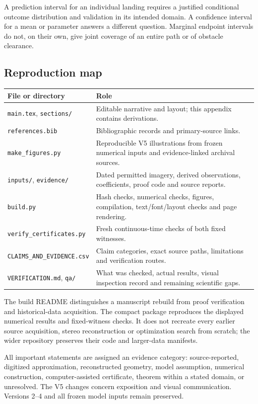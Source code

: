 A prediction interval for an individual landing requires a justified conditional outcome distribution and validation in its intended domain. A confidence interval for a mean or parameter answers a different question. Marginal endpoint intervals do not, on their own, give joint coverage of an entire path or of obstacle clearance.

\subsection*{Reproduction map}
\begin{tabularx}{\textwidth}{@{}>{\raggedright\arraybackslash}p{}>{\raggedright\arraybackslash}X@{}}\toprule
File or directory & Role\\\midrule
\texttt{main.tex}, \texttt{sections/} & Editable narrative and layout; this appendix contains derivations.\\
\texttt{references.bib} & Bibliographic records and primary-source links.\\
\texttt{make\_figures.py} & Reproducible V5 illustrations from frozen numerical inputs and evidence-linked archival sources.\\
\texttt{inputs/}, \texttt{evidence/} & Dated permitted imagery, derived observations, coefficients, proof code and source reports.\\
\texttt{build.py} & Hash checks, numerical checks, figures, compilation, text/font/layout checks and page rendering.\\
\texttt{verify\_\allowbreak certificates.py} & Fresh continuous-time checks of both fixed witnesses.\\
\texttt{CLAIMS\_\allowbreak AND\_\allowbreak EVIDENCE.csv} & Claim categories, exact source paths, limitations and verification routes.\\
\texttt{VERIFICATION.md}, \texttt{qa/} & What was checked, actual results, visual inspection record and remaining scientific gaps.\\\bottomrule
\end{tabularx}
\medskip

The build README distinguishes a manuscript rebuild from proof verification and historical-data acquisition. The compact package reproduces the displayed numerical results and fixed-witness checks. It does not recreate every earlier source acquisition, stereo reconstruction or optimization search from scratch; the wider repository preserves their code and larger-data manifests.

All important statements are assigned an evidence category: source-reported, digitized approximation, reconstructed geometry, model assumption, numerical construction, computer-assisted certificate, theorem within a stated domain, or unresolved. The V5 changes concern exposition and visual communication. Versions 2--4 and all frozen model inputs remain preserved.

